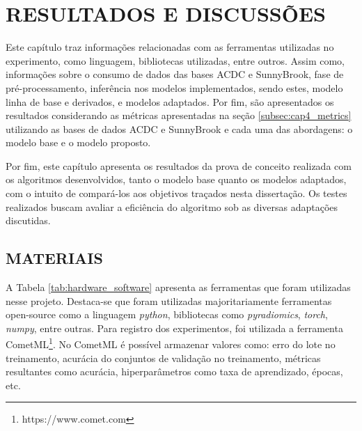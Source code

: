 \chapter{RESULTADOS E DISCUSSÕES}
\label{chap:proposta_experimental}

Este capítulo traz informações relacionadas com as ferramentas utilizadas no experimento, como linguagem, bibliotecas utilizadas, entre outros. Assim como, informações sobre o consumo de dados das bases \gls{ACDC} e SunnyBrook, fase de pré-processamento, inferência nos modelos implementados, sendo estes, modelo linha de base e derivados, e modelos adaptados. Por fim, são apresentados os resultados considerando as métricas apresentadas na seção \ref{subsec:cap4_metrics} utilizando as bases de dados ACDC e SunnyBrook e cada uma das abordagens: o modelo base e o modelo proposto.

Por fim, este capítulo apresenta os resultados da prova de conceito realizada com os algoritmos desenvolvidos, tanto o modelo base quanto os modelos adaptados, com o intuito de compará-los aos objetivos traçados nesta dissertação. Os testes realizados buscam avaliar a eficiência do algoritmo sob as diversas adaptações discutidas. 

\section{MATERIAIS} 
\label{sec:cap5_materiais}

A Tabela \ref{tab:hardware_software} apresenta as ferramentas que foram utilizadas nesse projeto. Destaca-se que foram utilizadas majoritariamente ferramentas open-source como a linguagem \textit{python}, bibliotecas como \textit{pyradiomics}, \textit{torch}, \textit{numpy}, entre outras. Para registro dos experimentos, foi utilizada a ferramenta CometML\footnote{https://www.comet.com}. No CometML é possível armazenar valores como: erro do lote no treinamento, acurácia do conjuntos de validação no treinamento, métricas resultantes como acurácia, hiperparâmetros como taxa de aprendizado, épocas, etc.
\newline

